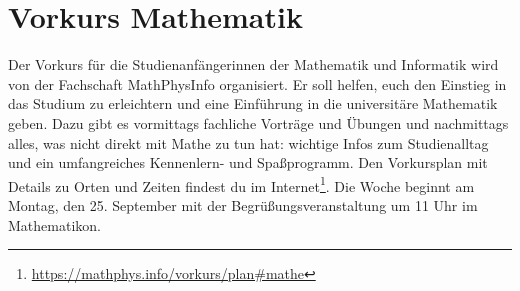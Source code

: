 \section{Vorkurs Mathematik}
Der Vorkurs für die Studienanfängerinnen der Mathematik und Informatik wird von der Fachschaft MathPhysInfo organisiert. Er soll helfen, euch den Einstieg in das Studium zu erleichtern und eine Einführung in die universitäre Mathematik geben. Dazu gibt es vormittags fachliche Vorträge und Übungen und nachmittags alles, was nicht direkt mit Mathe zu tun hat: wichtige Infos zum Studienalltag und ein umfangreiches Kennenlern- und Spaßprogramm. Den Vorkursplan mit Details zu Orten und Zeiten findest du im Internet\footnote{\label{mathe-vorkursplan}\url{https://mathphys.info/vorkurs/plan\#mathe}}. Die Woche beginnt am Montag, den 25. September mit der Begrüßungsveranstaltung um 11 Uhr im \gls{Mathematikon}.

